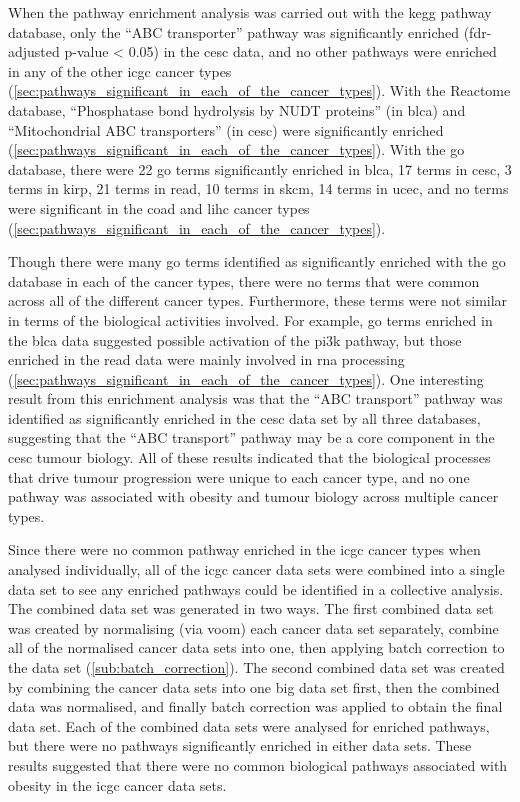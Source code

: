 When the pathway enrichment analysis was carried out with the \gls{kegg} pathway database, only the ``ABC transporter'' pathway was significantly enriched (\gls{fdr}-adjusted p-value \textless{} 0.05) in the \gls{cesc} data, and no other pathways were enriched in any of the other \gls{icgc} cancer types (\cref{sec:pathways_significant_in_each_of_the_cancer_types}).
With the Reactome database, ``Phosphatase bond hydrolysis by NUDT proteins'' (in \gls{blca}) and ``Mitochondrial ABC transporters'' (in \gls{cesc}) were significantly enriched (\cref{sec:pathways_significant_in_each_of_the_cancer_types}).
With the \gls{go} database, there were 22 \gls{go} terms significantly enriched in \gls{blca}, 17 terms in \gls{cesc}, 3 terms in \gls{kirp}, 21 terms in \gls{read}, 10 terms in \gls{skcm}, 14 terms in \gls{ucec}, and no terms were significant in the \gls{coad} and \gls{lihc} cancer types (\cref{sec:pathways_significant_in_each_of_the_cancer_types}).

Though there were many \gls{go} terms identified as significantly enriched with the \gls{go} database in each of the cancer types, there were no terms that were common across all of the different cancer types.
Furthermore, these terms were not similar in terms of the biological activities involved.
For example, \gls{go} terms enriched in the \gls{blca} data suggested possible activation of the \gls{pi3k} pathway, but those enriched in the \gls{read} data were mainly involved in \acrshort{rna} processing (\cref{sec:pathways_significant_in_each_of_the_cancer_types}).
One interesting result from this enrichment analysis was that the ``ABC transport'' pathway was identified as significantly enriched in the \gls{cesc} data set by all three databases, suggesting that the ``ABC transport'' pathway may be a core component in the \gls{cesc} tumour biology.
All of these results indicated that the biological processes that drive tumour progression were unique to each cancer type, and no one pathway was associated with obesity and tumour biology across multiple cancer types.

Since there were no common pathway enriched in the \gls{icgc} cancer types when analysed individually, all of the \gls{icgc} cancer data sets were combined into a single data set to see any enriched pathways could be identified in a collective analysis.
The combined data set was generated in two ways.
The first combined data set was created by normalising (via voom) each cancer data set separately, combine all of the normalised cancer data sets into one, then applying batch correction to the data set (\cref{sub:batch_correction}).
The second combined data set was created by combining the cancer data sets into one big data set first, then the combined data was normalised, and finally batch correction was applied to obtain the final data set.
Each of the combined data sets were analysed for enriched pathways, but there were no pathways significantly enriched in either data sets.
These results suggested that there were no common biological pathways associated with obesity in the \gls{icgc} cancer data sets.

